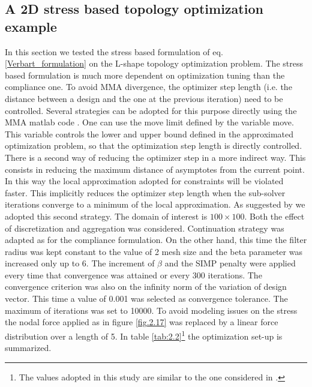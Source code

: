 \subsection{A 2D stress based topology optimization example}
In this section we tested the stress based formulation of eq. \ref{Verbart_formulation} on the L-shape topology optimization problem. The stress based formulation is much more dependent on optimization tuning than the compliance one. To avoid MMA divergence, the optimizer step length (i.e. the distance between a design and the one at the previous iteration) need to be controlled. Several strategies can be adopted for this purpose directly using the MMA matlab code \cite{svanberg1987method}. One can use the move limit defined by the variable move. This variable controls the lower and upper bound defined in the approximated optimization problem, so that the optimization step length is directly controlled. There is a second way of reducing the optimizer step in a more indirect way. This consists in reducing the maximum distance of asymptotes from the current point. In this way the local approximation adopted for constraints will be violated faster. This implicitly reduces the optimizer step length when the sub-solver iterations converge to a minimum of the local approximation. As suggested by \cite{verbart2017unified} we adopted this second strategy. The domain of interest is $100\times100$. Both the effect of discretization and aggregation was considered.
Continuation strategy was adapted as for the compliance formulation. On the other hand, this time the filter radius was kept constant to the value of 2 mesh size and the beta parameter was increased only up to 6. The increment of $\beta$ and the SIMP penalty were applied every time that convergence was attained or every 300 iterations. The convergence criterion was also on the infinity norm of the variation of design vector. This time a value of 0.001 was selected as convergence tolerance. The maximum of iterations was set to 10000. To avoid modeling issues on the stress the nodal force applied as in figure \ref{fig.2.17} was replaced by a linear force distribution over a length of 5. In table \ref{tab:2.2}\footnote{The values adopted in this study are similar to the one considered in \cite{verbart2017unified}.} the optimization set-up is summarized.
